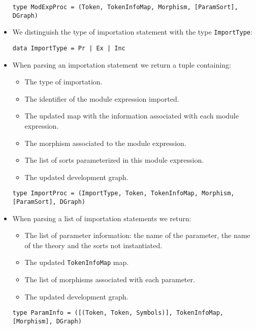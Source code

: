 \begin{itemize}
{\codesize
\begin{verbatim}
type ModExpProc = (Token, TokenInfoMap, Morphism, [ParamSort], DGraph)
\end{verbatim}
}

\item We distinguish the type of importation statement with the type
\verb"ImportType":

{\codesize
\begin{verbatim}
data ImportType = Pr | Ex | Inc
\end{verbatim}
}

\item When parsing an importation statement we return a tuple containing:

\begin{itemize}

\item The type of importation.
\item The identifier of the module expression imported.
\item The updated map with the information associated with each
module expression.
\item The morphism associated to the module expression.
\item The list of sorts parameterized in this module expression.
\item The updated development graph.
\end{itemize}

{\codesize
\begin{verbatim}
type ImportProc = (ImportType, Token, TokenInfoMap, Morphism, [ParamSort], DGraph)
\end{verbatim}
}

\item When parsing a list of importation statements we return:

\begin{itemize}
\item The list of parameter information: the name of the parameter,
the name of the theory and the sorts not instantiated.
\item The updated \verb"TokenInfoMap" map.
\item The list of morphisms associated with each parameter.
\item The updated development graph.
\end{itemize}

{\codesize
\begin{verbatim}
type ParamInfo = ([(Token, Token, Symbols)], TokenInfoMap, [Morphism], DGraph)
\end{verbatim}
}


\end{itemize}
